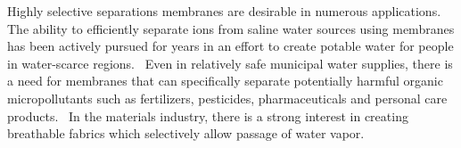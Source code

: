 \documentclass{article}
\begin{document}
  
  Highly selective separations membranes are desirable in numerous applications. 
  The ability to efficiently separate ions from saline water sources using membranes 
  has been actively pursued for years in an effort to create potable water for people 
  in water-scarce regions.~\cite{werber_materials_2016} Even in relatively safe
  municipal water supplies, there is a need for membranes that can specifically separate
  potentially harmful organic micropollutants such as fertilizers, pesticides, pharmaceuticals
  and personal care products.~\cite{barbosa_occurrence_2016} In the materials industry,
  there is a strong interest in creating breathable fabrics %
  which selectively allow passage of water vapor.~\cite{mondloch_destruction_2015}
\end{document}
